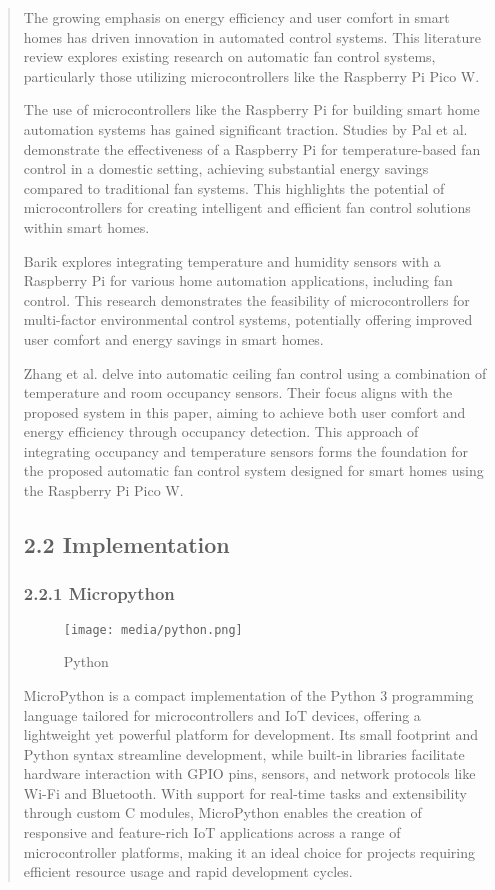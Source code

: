 \documentclass[12pt]{report}
\begin{document}
\begin{quote}
		The growing emphasis on energy efficiency and user comfort in smart homes has driven innovation in automated control systems. This literature review explores existing research on automatic fan control systems, particularly those utilizing microcontrollers like the Raspberry Pi Pico W.
		
		The use of microcontrollers like the Raspberry Pi for building smart home automation systems has gained significant traction. Studies by Pal et al. demonstrate the effectiveness of a Raspberry Pi for temperature-based fan control in a domestic setting, achieving substantial energy savings compared to traditional fan systems. This highlights the potential of microcontrollers for creating intelligent and efficient fan control solutions within smart homes.
		
		Barik explores integrating temperature and humidity sensors with a Raspberry Pi for various home automation applications, including fan control. This research demonstrates the feasibility of microcontrollers for multi-factor environmental control systems, potentially offering improved user comfort and energy savings in smart homes.
		
		Zhang et al. delve into automatic ceiling fan control using a combination of temperature and room occupancy sensors. Their focus aligns with the proposed system in this paper, aiming to achieve both user comfort and energy efficiency through occupancy detection. This approach of integrating occupancy and temperature sensors forms the foundation for the proposed automatic fan control system designed for smart homes using the Raspberry Pi Pico W.
		\clearpage
		
			\subsection{2.2 Implementation}
			\subsubsection{2.2.1 Micropython}
			\begin{figure}[h]
				\centering
				\hspace*{1.5cm}
				\texttt{[image: media/python.png]}\\
				\caption{Python}
			\end{figure}
			MicroPython is a compact implementation of the Python 3 programming language tailored for microcontrollers and IoT devices, offering a lightweight yet powerful platform for development. Its small footprint and Python syntax streamline development, while built-in libraries facilitate hardware interaction with GPIO pins, sensors, and network protocols like Wi-Fi and Bluetooth. With support for real-time tasks and extensibility through custom C modules, MicroPython enables the creation of responsive and feature-rich IoT applications across a range of microcontroller platforms, making it an ideal choice for projects requiring efficient resource usage and rapid development cycles.
			\clearpage
			

\end{quote}
\end{document}
